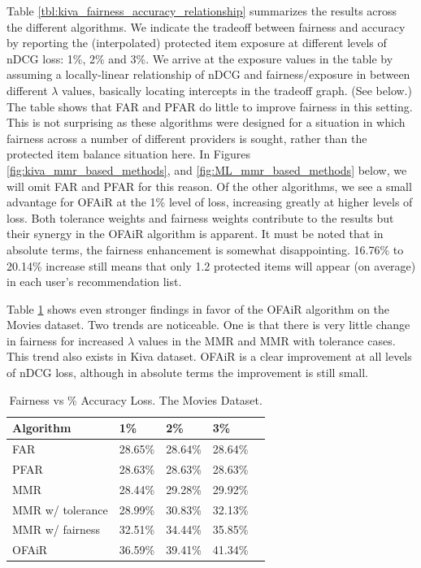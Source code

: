 Table \ref{tbl:kiva_fairness_accuracy_relationship} summarizes the results across the different algorithms. We indicate the tradeoff between fairness and accuracy by reporting the (interpolated) protected item exposure at different levels of nDCG loss: 1\%, 2\% and 3\%. We arrive at the exposure values in the table by assuming a locally-linear relationship of nDCG and fairness/exposure in between different $\lambda$ values, basically locating intercepts in the tradeoff graph. (See below.) The table shows that FAR and PFAR do little to improve fairness in this setting. This is not surprising as these algorithms were designed for a situation in which fairness across a number of different providers is sought, rather than the protected item balance situation here. In Figures \ref{fig:kiva_mmr_based_methods}, and \ref{fig:ML_mmr_based_methods} below, we will omit FAR and PFAR for this reason. Of the other algorithms, we see a small advantage for OFAiR at the 1\% level of loss, increasing greatly at higher levels of loss. Both tolerance weights and fairness weights contribute to the results but their synergy in the OFAiR algorithm is apparent. It must be noted that in absolute terms, the fairness enhancement is somewhat disappointing. 16.76\% to 20.14\% increase still means that only 1.2 protected items will appear (on average) in each user's recommendation list. 

Table \ref{tbl:ML_fairness_accuracy_relationship} shows even stronger findings in favor of the OFAiR algorithm on the Movies dataset. Two trends are noticeable. One is that there is very little change in fairness for increased $\lambda$ values in the MMR and MMR with tolerance cases. This trend also exists in Kiva dataset. OFAiR is a clear improvement at all levels of nDCG loss, although in absolute terms the improvement is still small.


\begin{table}[]
\centering
\begin{tabular}{lllll}
 
 Algorithm &  1\% & 2\% & 3\% \\
 \hline
 FAR & 28.65\% & 28.64\% & 28.64\% \\
 PFAR & 28.63\% & 28.63\% & 28.63\% \\
 MMR &  28.44\% & 29.28\% & 29.92\% \\
 MMR w/ tolerance & 28.99\% & 30.83\% & 32.13\%  \\
 MMR w/ fairness & 32.51\% & 34.44\% & 35.85\%  \\
 OFAiR & 36.59\% & 39.41\% & 41.34\% \\
 
 \hline
\end{tabular}
\caption{Fairness vs \% Accuracy Loss. The Movies Dataset.}
\label{tbl:ML_fairness_accuracy_relationship}
\end{table}

